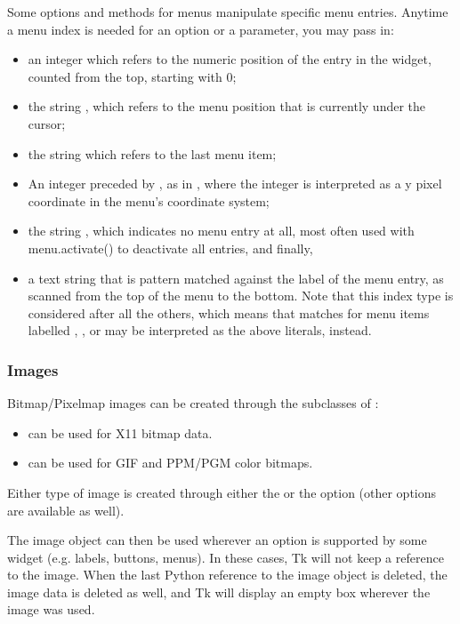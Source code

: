 \begin{description}
Some options and methods for menus manipulate specific menu entries.
Anytime a menu index is needed for an option or a parameter, you may
pass in: 
\begin{itemize}
\item   an integer which refers to the numeric position of the entry in
the widget, counted from the top, starting with 0; 
\item   the string , which refers to the menu position that is
currently under the cursor;
\item   the string  which refers to the last menu
item;  
\item   An integer preceded by , as in , where the integer is
interpreted as a y pixel coordinate in the menu's coordinate system;
\item   the string , which indicates no menu entry at all, most
often used with menu.activate() to deactivate all entries, and
finally,
\item   a text string that is pattern matched against the label of the
menu entry, as scanned from the top of the menu to the bottom.  Note
that this index type is considered after all the others, which means
that matches for menu items labelled , , or
 may be interpreted as the above literals, instead.
\end{itemize}
\end{description}

\subsubsection{Images}

Bitmap/Pixelmap images can be created through the subclasses of
:

\begin{itemize}
\item  {} can be used for X11 bitmap data.
\item  {} can be used for GIF and PPM/PGM color bitmaps.
\end{itemize}

Either type of image is created through either the  or the
 option (other options are available as well).

The image object can then be used wherever an  option is
supported by some widget (e.g. labels, buttons, menus). In these
cases, Tk will not keep a reference to the image. When the last Python
reference to the image object is deleted, the image data is deleted as
well, and Tk will display an empty box wherever the image was used.

